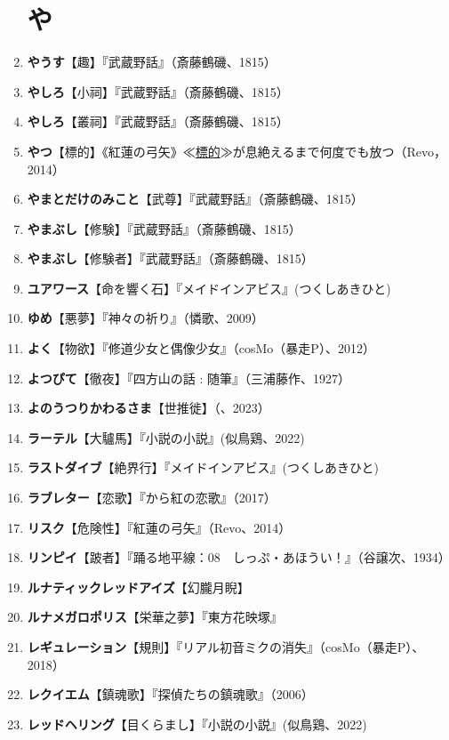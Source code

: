 \documentclass[twocolumn]{jsbook}
\newcommand{\ccite}[1]{《#1》}
\begin{document}
\begin{enumerate}
\section*{や}
    \item \textbf{やうす}【趣】『武蔵野話』（斎藤鶴磯、1815）
    \item \textbf{やしろ}【小祠】『武蔵野話』（斎藤鶴磯、1815）
    \item \textbf{やしろ}【叢祠】『武蔵野話』（斎藤鶴磯、1815）
    \item \textbf{やつ}【標的】\ccite{紅蓮の弓矢}{≪\uline{標的}≫が息絶えるまで何度でも放つ（Revo，2014）}
    \item \textbf{やまとだけのみこと}【武尊】『武蔵野話』（斎藤鶴磯、1815）
    \item \textbf{やまぶし}【修験】『武蔵野話』（斎藤鶴磯、1815）
    \item \textbf{やまぶし}【修験者】『武蔵野話』（斎藤鶴磯、1815）
    \item \textbf{ユアワース}【命を響く石】『メイドインアビス』(つくしあきひと)
    \item \textbf{ゆめ}【悪夢】『神々の祈り』（憐歌、2009）
    \item \textbf{よく}【物欲】『修道少女と偶像少女』（cosMo（暴走P）、2012）
    \item \textbf{よつぴて}【徹夜】『四方山の話 : 随筆』（三浦藤作、1927）
    \item \textbf{よのうつりかわるさま}【世推徙】（、2023）
    \item \textbf{ラーテル}【大驢馬】『小説の小説』(似鳥鶏、2022)
    \item \textbf{ラストダイブ}【絶界行】『メイドインアビス』(つくしあきひと)
    \item \textbf{ラブレター}【恋歌】『から紅の恋歌』（2017）
    \item \textbf{リスク}【危険性】『紅蓮の弓矢』（Revo、2014）
    \item \textbf{リンピイ}【跛者】『踊る地平線：08　しっぷ・あほうい！』（谷譲次、1934）
    \item \textbf{ルナティックレッドアイズ}【幻朧月睨】
    \item \textbf{ルナメガロポリス}【栄華之夢】『東方花映塚』
    \item \textbf{レギュレーション}【規則】『リアル初音ミクの消失』（cosMo（暴走P）、2018）
    \item \textbf{レクイエム}【鎮魂歌】『探偵たちの鎮魂歌』（2006）
    \item \textbf{レッドヘリング}【目くらまし】『小説の小説』(似鳥鶏、2022)

\end{enumerate}
\end{document}
